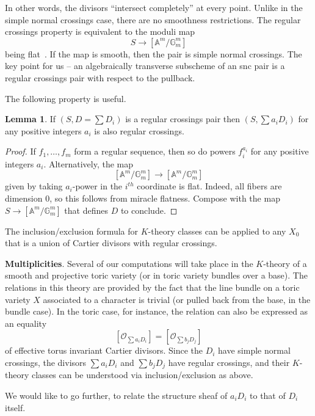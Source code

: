 \documentclass[11pt]{amsart}
\theoremstyle{definition}
\theoremstyle{definition}
\newtheorem{lemma}[theorem]{Lemma}
\begin{document}
In other words, the divisors ``intersect completely'' at every point. Unlike in the simple normal crossings case, there are no smoothness restrictions. The regular crossings property is equivalent to the moduli map
\[
S\to [\mathbb A^m/\mathbb G_m^m]
\]
being flat~\cite[\href{https://stacks.math.columbia.edu/tag/07DY}{Tag 07DY}]{stacks-project}. If the map is smooth, then the pair is simple normal crossings. The key point for us -- an algebraically transverse subscheme of an snc pair is a regular crossings pair with respect to the pullback. 

The following property is useful.

\begin{lemma}
If $(S,D = \sum D_i)$ is a regular crossings pair then $(S,\sum a_iD_i)$ for any positive integers $a_i$ is also regular crossings.
\end{lemma}

\begin{proof}
If $f_1,\ldots,f_m$ form a regular sequence, then so do powers $f_i^{a_i}$ for any positive integers $a_i$. Alternatively, the map
\[
[\mathbb A^m/\mathbb G_m^m]\to [\mathbb A^m/\mathbb G_m^m]
\]
given by taking $a_i$-power in the $i^{th}$ coordinate is flat. Indeed, all fibers are dimension $0$, so this follows from miracle flatness. Compose with the map $S\to [\mathbb A^m/\mathbb G_m^m]$ that defines $D$ to conclude.
\end{proof}

The inclusion/exclusion formula for $K$-theory classes can be applied to any $X_0$ that is a union of Cartier divisors with regular crossings. 

\noindent
{\bf Multiplicities}. Several of our computations will take place in the $K$-theory of a smooth and projective toric variety (or in toric variety bundles over a base). The relations in this theory are provided by the fact that the line bundle on a toric variety $X$ associated to a character is trivial (or pulled back from the base, in the bundle case). In the toric case, for instance, the relation can also be expressed as an equality
\[
[\mathcal O_{ \sum a_i D_i}] =  [\mathcal O_{\sum b_j D_j}]
\]
of effective torus invariant Cartier divisors. Since the $D_i$ have simple normal crossings, the divisors $\sum a_i D_i$ and $\sum b_j D_j$ have regular crossings, and their $K$-theory classes can be understood via inclusion/exclusion as above. 

We would like to go further, to relate the structure sheaf of $a_i D_i$ to that of $D_i$ itself. 
\end{document}

